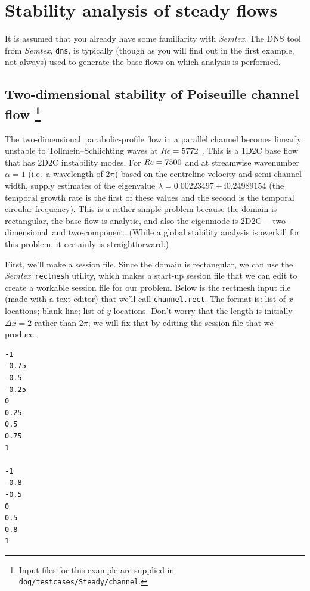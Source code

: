 \documentclass[11pt,a4paper]{report}
\newcommand\Rey{\mbox{\textit{Re}}}
\newcommand\ci{\mathrm{i}}
\newcommand\twod{two-di\-men\-sion\-al}
\newcommand\twoc{two-com\-po\-nent}
\newcommand{\ie}{i.e.\ }
\newcommand{\Semtex}{\emph{Semtex}}
\begin{document}
\chapter{Stability analysis of steady flows}
\label{ch.stab}

It is assumed that you already have some familiarity with \Semtex.
The DNS tool from \Semtex, \texttt{dns}, is typically (though as you
will find out in the first example, not always) used to generate the
base flows on which analysis is performed.


\section{Two-dimensional stability of Poiseuille channel flow
\protect\footnote{Input files for this example are supplied in
\texttt{dog/testcases/Steady/channel}.}
}
\label{sec.chan2d}

The \twod\ parabolic-profile flow in a parallel channel becomes
linearly unstable to Tollmein--Schlichting waves at $\Rey=5772$
\citep{ors71}.  This is a 1D2C base flow that has 2D2C instability
modes. For $\Rey=7500$ and at streamwise wavenumber $\alpha=1$ (\ie a
wavelength of $2\pi$) based on the centreline velocity and
semi-channel width, \citet[\S\,1.4]{chqz88} supply estimates of the
eigenvalue $\lambda=0.00223497+\ci 0.24989154$ (the temporal growth
rate is the first of these values and the second is the temporal
circular frequency).  This is a rather simple problem because the
domain is rectangular, the base flow is analytic, and also the
eigenmode is 2D2C\,---\,\twod\ and \twoc.  (While a global stability
analysis is overkill for this problem, it certainly is
straightforward.)

First, we'll make a session file. Since the domain is rectangular, we
can use the \Semtex\ \verb+rectmesh+ utility, which makes a start-up
session file that we can edit to create a workable session file for
our problem.  Below is the rectmesh input file (made with a text
editor) that we'll call \verb+channel.rect+.  The format is: list of
$x$-locations; blank line; list of $y$-locations.  Don't worry that
the length is initially $\Delta x=2$ rather than $2\pi$; we will fix
that by editing the session file that we produce.

{\small
\begin{verbatim}
-1
-0.75
-0.5
-0.25
0
0.25
0.5
0.75
1

-1
-0.8
-0.5
0
0.5
0.8
1
\end{verbatim}
}
\end{document}
